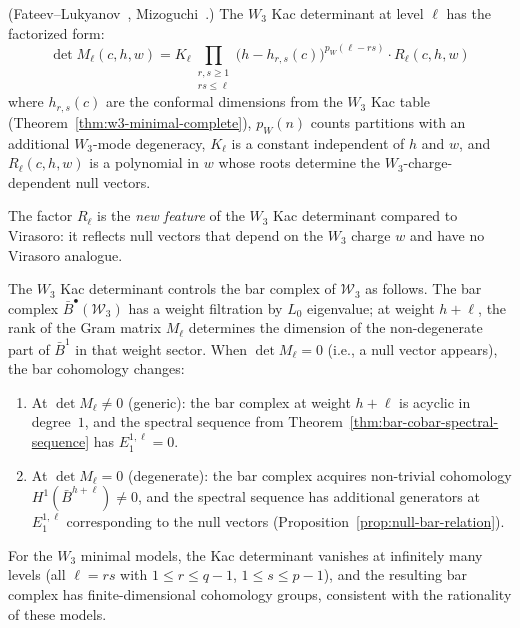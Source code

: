 \begin{theorem}\label{thm:w3-kac-general}
\textup{(Fateev--Lukyanov~\cite{FL88},
Mizoguchi~\cite{Mizoguchi89}.)}
The $W_3$ Kac determinant at level $\ell$ has the factorized form:
\begin{equation}\label{eq:w3-kac-factored}
\det M_\ell(c,h,w) = K_\ell
  \prod_{\substack{r,s \geq 1 \\ rs \leq \ell}}
  \bigl(h - h_{r,s}(c)\bigr)^{p_W(\ell - rs)}
  \cdot R_\ell(c,h,w)
\end{equation}
where $h_{r,s}(c)$ are the conformal dimensions from the $W_3$
Kac table \textup{(}Theorem~\ref{thm:w3-minimal-complete}\textup{)},
$p_W(n)$ counts partitions with an additional $W_3$-mode
degeneracy, $K_\ell$ is a constant independent of $h$ and $w$,
and $R_\ell(c,h,w)$ is a polynomial in $w$ whose roots determine
the $W_3$-charge-dependent null vectors.

The factor $R_\ell$ is the \emph{new feature} of the $W_3$
Kac determinant compared to Virasoro: it reflects null vectors
that depend on the $W_3$ charge $w$ and have no Virasoro analogue.
\end{theorem}

\begin{remark}
\label{rem:kac-det-bar}
The $W_3$ Kac determinant controls the bar complex of
$\mathcal{W}_3$ as follows.  The bar complex
$\bar{B}^\bullet(\mathcal{W}_3)$ has a weight filtration by $L_0$
eigenvalue; at weight $h + \ell$, the rank of the Gram matrix
$M_\ell$ determines the dimension of the non-degenerate part of
$\bar{B}^1$ in that weight sector.  When $\det M_\ell = 0$
(i.e., a null vector appears), the bar cohomology changes:

\begin{enumerate}
\item At $\det M_\ell \neq 0$ \textup{(}generic\textup{)}: the
  bar complex at weight $h + \ell$ is acyclic in degree~$1$, and
  the spectral sequence from Theorem~\ref{thm:bar-cobar-spectral-sequence}
  has $E_1^{1,\ell} = 0$.
\item At $\det M_\ell = 0$ \textup{(}degenerate\textup{)}: the bar
  complex acquires non-trivial cohomology $H^1(\bar{B}^{h+\ell})
  \neq 0$, and the spectral sequence has additional generators at
  $E_1^{1,\ell}$ corresponding to the null vectors
  \textup{(}Proposition~\ref{prop:null-bar-relation}\textup{)}.
\end{enumerate}

For the $W_3$ minimal models, the Kac determinant vanishes at
infinitely many levels (all $\ell = rs$ with $1 \leq r \leq q-1$,
$1 \leq s \leq p-1$), and the resulting bar complex has
finite-dimensional cohomology groups, consistent with the
rationality of these models.
\end{remark}

